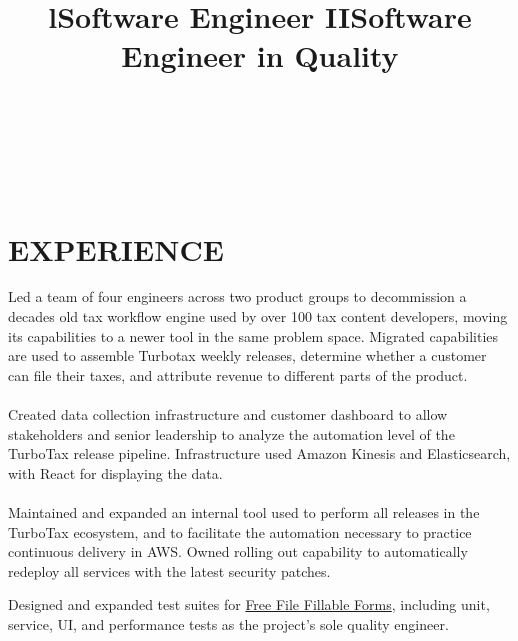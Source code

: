 \documentclass[margin]{res}
\begin{document}
\begin{resume}

\begin{format}
\title{l}\\
\\
\body\\
\end{format}

\section{EXPERIENCE}

\title{\textbf{Software Engineer II}}
\begin{position}
Led a team of four engineers across two product groups to decommission a decades old tax workflow engine used by over 100 tax content developers, moving its capabilities to a newer tool in the same problem space. Migrated capabilities are used to assemble Turbotax weekly releases, determine whether a customer can file their taxes, and attribute revenue to different parts of the product.
\\
\\
Created data collection infrastructure and customer dashboard to allow stakeholders and senior leadership to analyze the automation level of the TurboTax release pipeline. Infrastructure used Amazon Kinesis and Elasticsearch, with React for displaying the data.
\\
\\
Maintained and expanded an internal tool used to perform all releases in the TurboTax ecosystem, and to facilitate the automation necessary to practice continuous delivery in AWS. Owned rolling out capability to automatically redeploy all services with the latest security patches.
\end{position}

\title{\textbf{Software Engineer in Quality}}
\begin{position}
Designed and expanded test suites for \href{https://www.FreeFileFillableForms.com}{Free File Fillable Forms}, including unit, service, UI, and performance tests as the project's sole quality engineer.
\end{position}


\end{resume}
\end{document}
